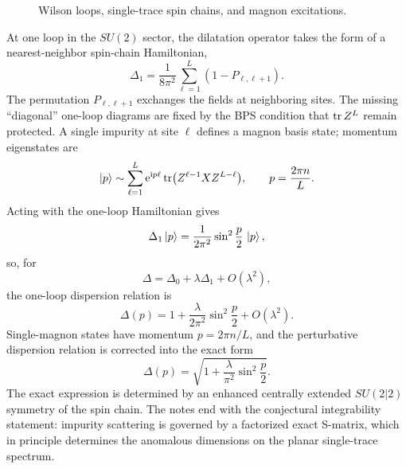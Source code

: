 \begin{figure}[htbp]
\centering
{}
\caption{Wilson loops, single-trace spin chains, and magnon excitations.}
\end{figure}

At one loop in the \(SU(2)\) sector, the dilatation operator takes the
form of a nearest-neighbor spin-chain Hamiltonian,
\[
  \Delta_1
  =
  \frac{1}{8\pi^2}
  \sum_{\ell=1}^L(1-P_{\ell,\ell+1}).
\]
The permutation \(P_{\ell,\ell+1}\) exchanges the fields at neighboring
sites.  The missing ``diagonal'' one-loop diagrams are fixed by the BPS
condition that \(\tr Z^L\) remain protected.  A single impurity at site
\(\ell\) defines a magnon basis state; momentum eigenstates are
\[
  \ket p\sim\sum_{\ell=1}^L
  \mathrm{e}^{\mathrm{i} p\ell}\tr(Z^{\ell-1}XZ^{L-\ell}),
  \qquad
  p=\frac{2\pi n}{L}.
\]
Acting with the one-loop Hamiltonian gives
\[
  \Delta_1\ket p
  =
  \frac1{2\pi^2}\sin^2\frac p2\,\ket p,
\]
so, for
\[
  \Delta=\Delta_0+\lambda\Delta_1+O(\lambda^2),
\]
the one-loop dispersion relation is
\[
  \Delta(p)=1+\frac{\lambda}{2\pi^2}\sin^2\frac p2+O(\lambda^2).
\]
Single-magnon states have momentum \(p=2\pi n/L\), and the perturbative
dispersion relation is corrected into the exact form
\[
  \Delta(p)
  =
  \sqrt{1+\frac{\lambda}{\pi^2}\sin^2\frac p2}.
\]
The exact expression is determined by an enhanced centrally extended
\(SU(2|2)\) symmetry of the spin chain.  The notes end with the
conjectural integrability statement: impurity scattering is governed by
a factorized exact S-matrix, which in principle determines the anomalous
dimensions on the planar single-trace spectrum.
